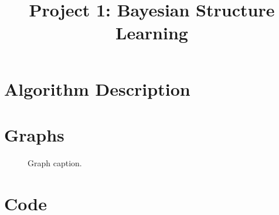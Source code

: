 \documentclass[twoside,11pt]{article}
\begin{document}
\title{Project 1: Bayesian Structure Learning}



\maketitle


\section{Algorithm Description}
\lipsum[2]



\section{Graphs}
\begin{figure}[h]
    \centering
    \caption{Graph caption.}
\end{figure}



\section{Code}
\end{document}
